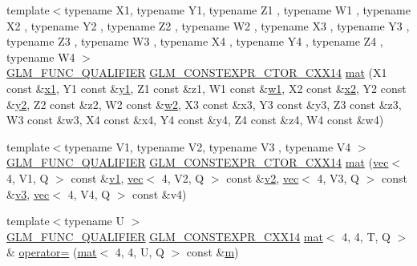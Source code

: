 \begin{DoxyCompactItemize}
{\footnotesize template$<$typename X1, typename Y1, typename Z1 , typename W1 , typename X2 , typename Y2 , typename Z2 , typename W2 , typename X3 , typename Y3 , typename Z3 , typename W3 , typename X4 , typename Y4 , typename Z4 , typename W4 $>$ }\\\mbox{\hyperlink{setup_8hpp_a33fdea6f91c5f834105f7415e2a64407}{G\+L\+M\+\_\+\+F\+U\+N\+C\+\_\+\+Q\+U\+A\+L\+I\+F\+I\+ER}} \mbox{\hyperlink{setup_8hpp_a0900f9145e68bf6061b6f5e7be3fa751}{G\+L\+M\+\_\+\+C\+O\+N\+S\+T\+E\+X\+P\+R\+\_\+\+C\+T\+O\+R\+\_\+\+C\+X\+X14}} \mbox{\hyperlink{structglm_1_1mat_3_014_00_014_00_01_t_00_01_q_01_4_ae64b907a3bd648bb5f89b20f1f06dd4c}{mat}} (X1 const \&\mbox{\hyperlink{_s_d_l__opengl__glext_8h_a49825216c96caaeb09237b36651181c5}{x1}}, Y1 const \&\mbox{\hyperlink{_s_d_l__opengl__glext_8h_a3af6c78fcdfccea028a5878bc747ef39}{y1}}, Z1 const \&z1, W1 const \&\mbox{\hyperlink{_s_d_l__opengl__glext_8h_ab5b747bf5adb1f9134337c30b9a4ce84}{w1}}, X2 const \&\mbox{\hyperlink{_s_d_l__opengl__glext_8h_a7b907a03236685c534d89d604cff23c8}{x2}}, Y2 const \&\mbox{\hyperlink{_s_d_l__opengl__glext_8h_a2be1135ed68e8d80fa9e130c7814f8c2}{y2}}, Z2 const \&z2, W2 const \&\mbox{\hyperlink{_s_d_l__opengl__glext_8h_a1ca5aca787be24213d9591fdf074b094}{w2}}, X3 const \&x3, Y3 const \&y3, Z3 const \&z3, W3 const \&w3, X4 const \&x4, Y4 const \&y4, Z4 const \&z4, W4 const \&w4)
\item 
{\footnotesize template$<$typename V1, typename V2, typename V3 , typename V4 $>$ }\\\mbox{\hyperlink{setup_8hpp_a33fdea6f91c5f834105f7415e2a64407}{G\+L\+M\+\_\+\+F\+U\+N\+C\+\_\+\+Q\+U\+A\+L\+I\+F\+I\+ER}} \mbox{\hyperlink{setup_8hpp_a0900f9145e68bf6061b6f5e7be3fa751}{G\+L\+M\+\_\+\+C\+O\+N\+S\+T\+E\+X\+P\+R\+\_\+\+C\+T\+O\+R\+\_\+\+C\+X\+X14}} \mbox{\hyperlink{structglm_1_1mat_3_014_00_014_00_01_t_00_01_q_01_4_a64d62a7aac7c48e676c72563f1e4c100}{mat}} (\mbox{\hyperlink{structglm_1_1vec}{vec}}$<$ 4, V1, Q $>$ const \&\mbox{\hyperlink{_s_d_l__opengl__glext_8h_a435c176a02c061b43e19bdf7c86cceae}{v1}}, \mbox{\hyperlink{structglm_1_1vec}{vec}}$<$ 4, V2, Q $>$ const \&\mbox{\hyperlink{_s_d_l__opengl__glext_8h_a0928f6d0f0f794ba000a21dfae422136}{v2}}, \mbox{\hyperlink{structglm_1_1vec}{vec}}$<$ 4, V3, Q $>$ const \&\mbox{\hyperlink{_s_d_l__opengl__glext_8h_acc806b31cbf466ceba6555983d8b814d}{v3}}, \mbox{\hyperlink{structglm_1_1vec}{vec}}$<$ 4, V4, Q $>$ const \&v4)
\item 
{\footnotesize template$<$typename U $>$ }\\\mbox{\hyperlink{setup_8hpp_a33fdea6f91c5f834105f7415e2a64407}{G\+L\+M\+\_\+\+F\+U\+N\+C\+\_\+\+Q\+U\+A\+L\+I\+F\+I\+ER}} \mbox{\hyperlink{setup_8hpp_a4dd12abf5e1164bc57f3a34671d03844}{G\+L\+M\+\_\+\+C\+O\+N\+S\+T\+E\+X\+P\+R\+\_\+\+C\+X\+X14}} \mbox{\hyperlink{structglm_1_1mat}{mat}}$<$ 4, 4, T, Q $>$ \& \mbox{\hyperlink{structglm_1_1mat_3_014_00_014_00_01_t_00_01_q_01_4_a835f3a0f213fcc160f198bf98c9b5bf0}{operator=}} (\mbox{\hyperlink{structglm_1_1mat}{mat}}$<$ 4, 4, U, Q $>$ const \&\mbox{\hyperlink{_s_d_l__opengl__glext_8h_af593500c283bf1a787a6f947f503a5c2}{m}})

\end{DoxyCompactItemize}
